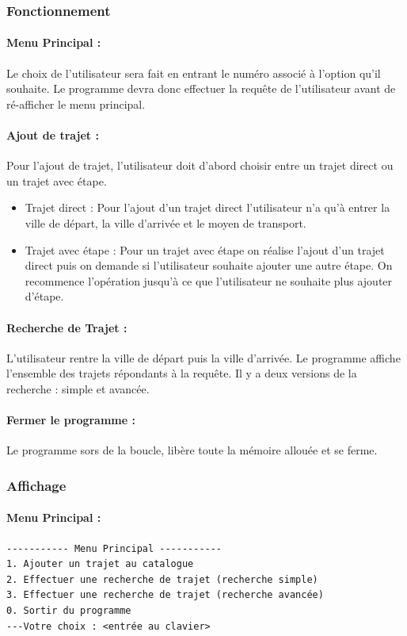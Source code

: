 \documentclass[10pt,a4paper,twoside]{article}
\begin{document}
\subsubsection{Fonctionnement}
\paragraph{Menu Principal :} Le choix de l'utilisateur sera fait en entrant le numéro associé à l'option qu'il souhaite. Le programme devra donc effectuer la requête de l'utilisateur avant de ré-afficher le menu principal.
\paragraph{Ajout de trajet :} Pour l'ajout de trajet, l'utilisateur doit d'abord choisir entre un trajet direct ou un trajet avec étape. 
\begin{itemize}
\item Trajet direct : Pour l'ajout d'un trajet direct l'utilisateur n'a qu'à entrer la ville de départ, la ville d'arrivée et le moyen de transport.
\item Trajet avec étape : Pour un trajet avec étape on réalise l'ajout d'un trajet direct puis on demande si l'utilisateur souhaite ajouter une autre étape. On recommence l'opération jusqu'à ce que l'utilisateur ne souhaite plus ajouter d'étape.
\end{itemize}

\paragraph{Recherche de Trajet :} L'utilisateur rentre la ville de départ puis la ville d'arrivée. Le programme affiche l'ensemble des trajets répondants à la requête. Il y a deux versions de la recherche : simple et avancée.
\paragraph{Fermer le programme :} Le programme sors de la boucle, libère toute la mémoire allouée et se ferme.

\subsubsection{Affichage}
\paragraph{Menu Principal :}
\begin{verbatim}
----------- Menu Principal -----------
1. Ajouter un trajet au catalogue
2. Effectuer une recherche de trajet (recherche simple)
3. Effectuer une recherche de trajet (recherche avancée)
0. Sortir du programme
---Votre choix : <entrée au clavier>
\end{verbatim}
\end{document}
